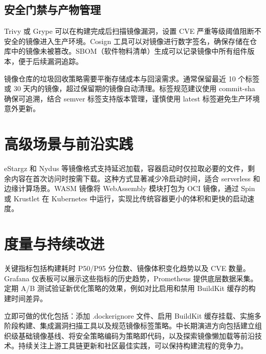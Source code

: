\section{安全门禁与产物管理}
Trivy 或 Grype 可以在构建完成后扫描镜像漏洞，设置 CVE 严重等级阈值阻断不安全的镜像进入生产环境。Cosign 工具可以对镜像进行数字签名，确保存储在仓库中的镜像未被篡改。SBOM（软件物料清单）生成可以记录镜像中所有组件版本，便于后续漏洞追踪。\par
镜像仓库的垃圾回收策略需要平衡存储成本与回滚需求。通常保留最近 10 个标签或 30 天内的镜像，超过保留期的镜像自动清理。标签规范建议使用 commit-sha 确保可追溯，结合 semver 标签支持版本管理，谨慎使用 latest 标签避免生产环境意外更新。\par
\chapter{高级场景与前沿实践}
eStargz 和 Nydus 等镜像格式支持延迟加载，容器启动时仅拉取必要的文件，剩余内容在首次访问时按需下载。这种方式显著减少冷启动时间，适合 serverless 和边缘计算场景。WASM 镜像将 WebAssembly 模块打包为 OCI 镜像，通过 Spin 或 Krustlet 在 Kubernetes 中运行，实现比传统容器更小的体积和更快的启动速度。\par
\chapter{度量与持续改进}
关键指标包括构建耗时 P50/P95 分位数、镜像体积变化趋势以及 CVE 数量。Grafana 仪表板可以展示这些指标的历史趋势，Prometheus 提供底层数据采集。定期 A/B 测试验证新优化策略的效果，例如对比启用和禁用 BuildKit 缓存的构建时间差异。\par
立即可做的优化包括：添加 .dockerignore 文件、启用 BuildKit 缓存挂载、实施多阶段构建、集成漏洞扫描工具以及规范镜像标签策略。中长期演进方向包括建立组织级基础镜像基线、将安全策略编码为策略即代码，以及探索镜像懒加载等前沿技术。持续关注上游工具链更新和社区最佳实践，可以保持构建流程的竞争力。\par
